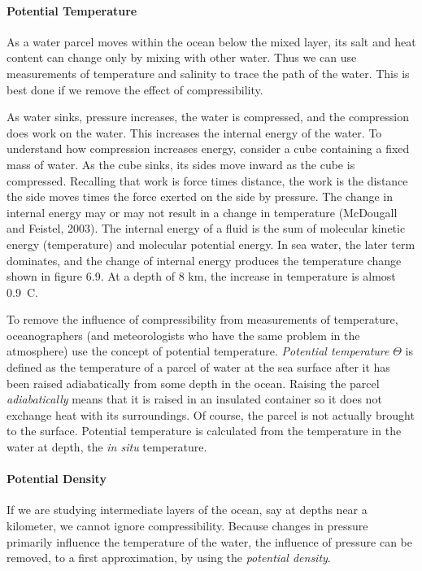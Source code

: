 \paragraph{Potential Temperature}
As a water
parcel moves within the ocean below the mixed layer, its salt and heat content can change only by mixing with
other water. Thus we can use measurements of temperature and salinity
to trace the path of the water. This is best done if we remove the
effect of compressibility.

As water sinks, pressure increases, the water is compressed, and the
compression does work on the water. This increases the internal energy
of the water. To understand how compression increases energy, consider
a cube containing a fixed mass of water. As the cube sinks, its sides
move inward as the cube is compressed. Recalling that work is force
times distance, the work is the distance the side moves times the
force exerted on the side by pressure. The change in internal energy
may or may not result in a change in temperature (McDougall and
Feistel, 2003). The internal energy of a fluid is the sum of molecular
kinetic energy (temperature) and molecular potential energy. In sea
water, the later term dominates, and the change of internal energy
produces the temperature change shown in figure 6.9. At a depth of 8
km, the increase in temperature is almost 0.9\degrees\ C.

To remove the influence of compressibility from measurements of
temperature, oceanographers (and meteorologists who have the same
problem in the atmosphere) use the concept of potential
temperature. \textit{Potential
  temperature}
$\Theta$ is defined as the temperature of a parcel of water at the sea
surface after it has been raised adiabatically from some depth in the
ocean. Raising the parcel \textit{adiabatically}
means that it is raised in an insulated
container so it does not exchange heat with its surroundings. Of
course, the parcel is not actually brought to the surface. Potential
temperature is calculated from the temperature in the water at depth,
the \textit{in situ} temperature.

\paragraph{Potential Density}
If we
are studying intermediate layers of the ocean, say at depths near a
kilometer, we cannot ignore compressibility. Because changes in
pressure primarily influence the temperature of the water, the
influence of pressure can be removed, to a first approximation, by
using the \textit{potential density}.

